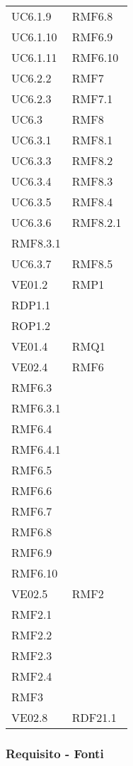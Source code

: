 \begin{longtable}[h!] { >{\centering}m{5cm} >{\centering}m{5cm} }
	 UC6.1.9 & RMF6.8
	 \tabularnewline
	 UC6.1.10 & RMF6.9
	 \tabularnewline
	 UC6.1.11 & RMF6.10
	 \tabularnewline
	 UC6.2.2 & RMF7
	 \tabularnewline
	 UC6.2.3 & RMF7.1
	 \tabularnewline
	 UC6.3 & RMF8
	 \tabularnewline
	 UC6.3.1 & RMF8.1
	 \tabularnewline
	 UC6.3.3 & RMF8.2
	 \tabularnewline
	 UC6.3.4 & RMF8.3
	 \tabularnewline
	 UC6.3.5 & RMF8.4
	 \tabularnewline
	 UC6.3.6 & RMF8.2.1 \\ 
	 RMF8.3.1 
	 \tabularnewline
	 UC6.3.7 & RMF8.5
	 \tabularnewline
	 VE01.2 & RMP1 \\
	 RDP1.1 \\
	 ROP1.2 
	 \tabularnewline
	 VE01.4 & RMQ1
	 \tabularnewline
	 VE02.4 & RMF6\\
	 RMF6.3 \\
	 RMF6.3.1 \\
	 RMF6.4 \\
	 RMF6.4.1 \\
	 RMF6.5 \\
	 RMF6.6 \\
	 RMF6.7 \\
	 RMF6.8 \\
	 RMF6.9 \\
	 RMF6.10 
	 \tabularnewline
	 VE02.5 & RMF2 \\
	 RMF2.1 \\
	 RMF2.2 \\
	 RMF2.3 \\
	 RMF2.4 \\
	 RMF3
	 \tabularnewline
	 VE02.8 & RDF21.1
	 \tabularnewline
	
\end{longtable}

\newpage

\subsubsection{Requisito - Fonti}

